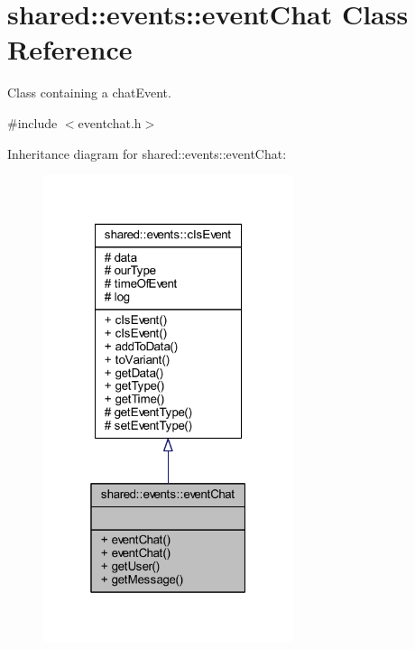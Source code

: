 \hypertarget{classshared_1_1events_1_1event_chat}{\section{shared\-:\-:events\-:\-:event\-Chat Class Reference}
\label{d1/d68/classshared_1_1events_1_1event_chat}
}


Class containing a chat\-Event.  




{\ttfamily \#include $<$eventchat.\-h$>$}



Inheritance diagram for shared\-:\-:events\-:\-:event\-Chat\-:\nopagebreak
\begin{figure}[H]
\begin{center}
\leavevmode
\includegraphics[width=208pt]{d9/de3/classshared_1_1events_1_1event_chat__inherit__graph}
\end{center}
\end{figure}


